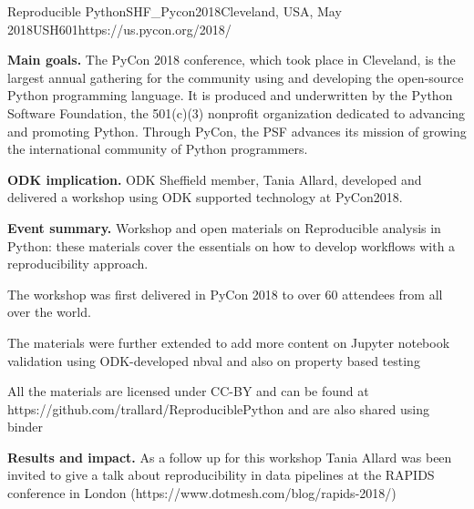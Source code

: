 \begin{event}{Reproducible Python}{SHF_Pycon2018}{Cleveland, USA, May 2018}{USH}{60}{1}{https://us.pycon.org/2018/}

\textbf{Main goals.} The PyCon 2018 conference, which took place in Cleveland, is the largest annual gathering for the community using and developing the open-source Python programming language. It is produced and underwritten by the Python Software Foundation, the 501(c)(3) nonprofit organization dedicated to advancing and promoting Python. Through PyCon, the PSF advances its mission of growing the international community of Python programmers.

\textbf{ODK implication.} ODK Sheffield member, Tania Allard, developed and delivered a workshop using ODK supported technology at PyCon2018.

\textbf{Event summary.} Workshop and open materials on Reproducible analysis in Python: these materials cover the essentials on how to develop workflows with a reproducibility approach.

The workshop was first delivered in PyCon 2018 to over 60 attendees from all over the world.

The materials were further extended to add more content on Jupyter notebook validation using ODK-developed nbval and also on property based testing

All the materials are licensed under CC-BY and can be found at https://github.com/trallard/ReproduciblePython and are also shared using binder

\textbf{Results and impact.} As a follow up for this workshop Tania Allard was been invited to give a talk about reproducibility in data pipelines at the RAPIDS conference in London (https://www.dotmesh.com/blog/rapids-2018/)

\end{event}
